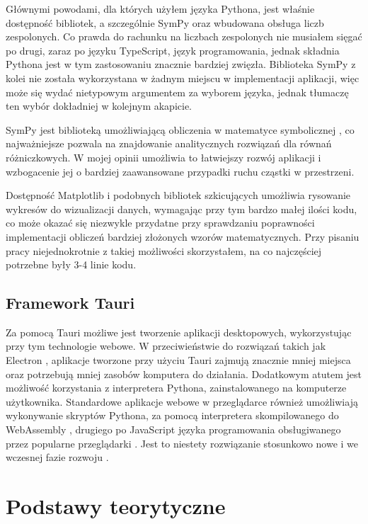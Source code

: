 \documentclass{SGGW-thesis}
\begin{document}
	Głównymi powodami, dla których użyłem języka Pythona, jest właśnie dostępność bibliotek, a szczególnie SymPy oraz wbudowana obsługa liczb zespolonych. Co prawda do rachunku na liczbach zespolonych nie musiałem sięgać po drugi, zaraz po języku TypeScript, język programowania, jednak składnia Pythona jest w tym zastosowaniu znacznie bardziej zwięzła. Biblioteka SymPy z kolei nie została wykorzystana w żadnym miejscu w implementacji aplikacji, więc może się wydać nietypowym argumentem za wyborem języka, jednak tłumaczę ten wybór dokładniej w kolejnym akapicie. 
	
	SymPy jest biblioteką umożliwiającą obliczenia w matematyce symbolicznej \cite{sympy}, co najważniejsze pozwala na znajdowanie analitycznych rozwiązań dla równań różniczkowych. W mojej opinii umożliwia to łatwiejszy rozwój aplikacji i wzbogacenie jej o bardziej zaawansowane przypadki ruchu cząstki w przestrzeni.
	
	Dostępność Matplotlib i podobnych bibliotek szkicujących umożliwia rysowanie wykresów do wizualizacji danych, wymagając przy tym bardzo małej ilości kodu, co może okazać się niezwykle przydatne przy sprawdzaniu poprawności implementacji obliczeń bardziej złożonych wzorów matematycznych. Przy pisaniu pracy niejednokrotnie z takiej możliwości skorzystałem, na co najczęściej potrzebne były 3-4 linie kodu.
	
	\section{Framework Tauri}
	Za pomocą Tauri możliwe jest tworzenie aplikacji desktopowych, wykorzystując przy tym technologie webowe. W przeciwieństwie do rozwiązań takich jak Electron \cite{electron}, aplikacje tworzone przy użyciu Tauri zajmują znacznie mniej miejsca oraz potrzebują mniej zasobów komputera do działania. 
	Dodatkowym atutem jest możliwość korzystania z interpretera Pythona, zainstalowanego na komputerze użytkownika. Standardowe aplikacje webowe w przeglądarce również umożliwiają wykonywanie skryptów Pythona, za pomocą interpretera skompilowanego do WebAssembly \cite{WebAssembly Python}, drugiego po JavaScript języka programowania obsługiwanego przez popularne przeglądarki \cite{browser langs}. Jest to niestety rozwiązanie stosunkowo nowe i we wczesnej fazie rozwoju \cite{python-webassembly}.
	
\chapter{Podstawy teorytyczne}
\end{document}
